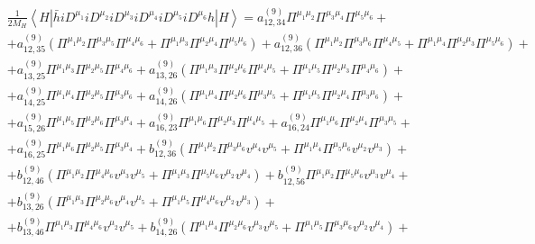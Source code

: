 \begin{align}\label{eqn:chap4_dim9_SI_Decomp}
&\frac{1}{2 M_{H}}\left\langle H\left|\bar{h} i D^{\mu_{1}} i D^{\mu_{2}} i D^{\mu_{3}} i D^{\mu_{4}} i D^{\mu_{5}} i D^{\mu_{6}} h\right| H\right\rangle= a_{12,34}^{(9)} \Pi^{\mu_{1} \mu_{2}} \Pi^{\mu_{3} \mu_{4}} \Pi^{\mu_{5} \mu_{6}}+\nonumber\\
&+a_{12,35}^{(9)}\left(\Pi^{\mu_{1} \mu_{2}} \Pi^{\mu_{3} \mu_{5}}\Pi^{\mu_{4} \mu_{6}}+\Pi^{\mu_{1} \mu_{3}} \Pi^{\mu_{2} \mu_{4}} \Pi^{\mu_{5} \mu_{6}}\right)+a_{12,36}^{(9)}\left(\Pi^{\mu_{1} \mu_{2}} \Pi^{\mu_{3} \mu_{6}}\Pi^{\mu_{4} \mu_{5}}+\Pi^{\mu_{1} \mu_{4}} \Pi^{\mu_{2} \mu_{3}} \Pi^{\mu_{5} \mu_{6}}\right)+\nonumber\\
&+a_{13,25}^{(9)} \Pi^{\mu_{1} \mu_{3}} \Pi^{\mu_{2} \mu_{5}} \Pi^{\mu_{4} \mu_{6}}+a_{13,26}^{(9)}\left(\Pi^{\mu_{1} \mu_{3}} \Pi^{\mu_{2} \mu_{6}} \Pi^{\mu_{4} \mu_{5}}+\Pi^{\mu_{1} \mu_{5}} \Pi^{\mu_{2} \mu_{3}} \Pi^{\mu_{4} \mu_{6}}\right)+\nonumber\\
&+a_{14,25}^{(9)} \Pi^{\mu_{1} \mu_{4}} \Pi^{\mu_{2} \mu_{5}}\Pi^{\mu_{3} \mu_{6}} +a_{14,26}^{(9)}\left(\Pi^{\mu_{1} \mu_{4}} \Pi^{\mu_{2} \mu_{6}} \Pi^{\mu_{3} \mu_{5}}+\Pi^{\mu_{1} \mu_{5}} \Pi^{\mu_{2} \mu_{4}} \Pi^{\mu_{3} \mu_{6}}\right)+\nonumber\\
&+a_{15,26}^{(9)} \Pi^{\mu_{1} \mu_{5}} \Pi^{\mu_{2} \mu_{6}} \Pi^{\mu_{3} \mu_{4}}+a_{16,23}^{(9)} \Pi^{\mu_{1} \mu_{6}} \Pi^{\mu_{2} \mu_{3}} \Pi^{\mu_{4} \mu_{5}}+a_{16,24}^{(9)} \Pi^{\mu_{1} \mu_{6}} \Pi^{\mu_{2} \mu_{4}} \Pi^{\mu_{3} \mu_{5}}+\nonumber\\
&+a_{16,25}^{(9)} \Pi^{\mu_1 \mu_6} \Pi^{\mu_{2} \mu_{5}}\Pi^{\mu_{3} \mu_{4}}  +b_{12,36}^{(9)}\left(\Pi^{\mu_{1} \mu_{2}} \Pi^{\mu_{3} \mu_{6}} v^{\mu_{4}} v^{\mu_{5}}+\Pi^{\mu_{1} \mu_{4}} \Pi^{\mu_{5} \mu_{6}} v^{\mu_{2}} v^{\mu_{3}}\right)+\nonumber\\
&+b_{12,46}^{(9)}\left(\Pi^{\mu_{1} \mu_{2}} \Pi^{\mu_{4} \mu_{6}} v^{\mu_{3}} v^{\mu_{5}}+\Pi^{\mu_{1} \mu_{3}} \Pi^{\mu_{5} \mu_{6}} v^{\mu_{2}} v^{\mu_{4}}\right)+b_{12,56}^{(9)} \Pi^{\mu_{1} \mu_{2}} \Pi^{\mu_{5} \mu_{6}} v^{\mu_{3}} v^{\mu_{4}}+\nonumber\\
&+b_{13,26}^{(9)}\left(\Pi^{\mu_{1} \mu_{3}} \Pi^{\mu_{2} \mu_{6}} v^{\mu_{4}} v^{\mu_{5}}+\Pi^{\mu_{1} \mu_{5}} \Pi^{\mu_{4} \mu_{6}} v^{\mu_{2}} v^{\mu_{3}}\right)+\nonumber\\
&+b_{13,46}^{(9)} \Pi^{\mu_{1} \mu_{3}} \Pi^{\mu_{4} \mu_{6}} v^{\mu_{2}} v^{\mu_{5}}+b_{14,26}^{(9)}\left(\Pi^{\mu_{1} \mu_{4}} \Pi^{\mu_{2} \mu_{6}} v^{\mu_{3}} v^{\mu_{5}} +\Pi^{\mu_{1} \mu_{5}}\Pi^{\mu_{3} \mu_{6}}v^{\mu_{2}} v^{\mu_{4}}\right)+\nonumber\\

\end{align}
